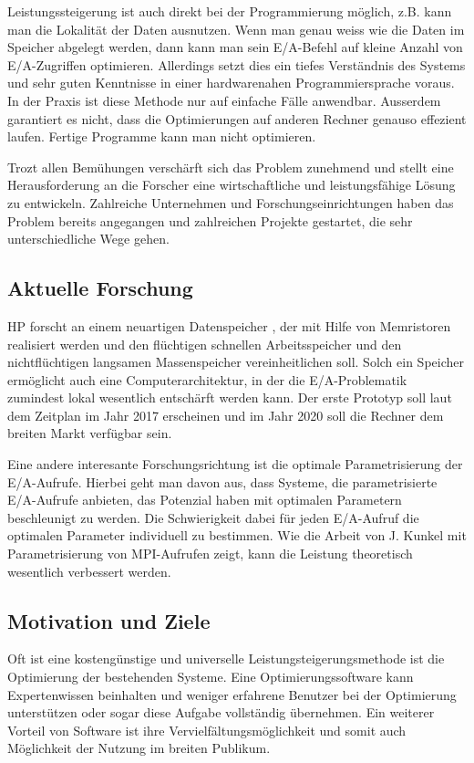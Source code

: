 Leistungssteigerung ist auch direkt bei der Programmierung möglich, z.B. kann man die Lokalität der Daten ausnutzen. Wenn man genau weiss wie die Daten im Speicher abgelegt werden, dann kann man sein E/A-Befehl auf kleine Anzahl von E/A-Zugriffen optimieren. Allerdings setzt dies ein tiefes Verständnis des Systems und sehr guten Kenntnisse in einer hardwarenahen Programmiersprache voraus. In der Praxis ist diese Methode nur auf einfache Fälle anwendbar. Ausserdem garantiert es nicht, dass die Optimierungen auf anderen Rechner genauso effezient laufen. Fertige Programme kann man nicht optimieren.

Trozt allen Bemühungen verschärft sich das Problem zunehmend und stellt eine Herausforderung an die Forscher eine wirtschaftliche und leistungsfähige Lösung zu entwickeln. Zahlreiche Unternehmen und Forschungseinrichtungen haben das Problem bereits angegangen und zahlreichen Projekte gestartet, die sehr unterschiedliche Wege gehen.


\subsection{Aktuelle Forschung}
HP forscht an einem neuartigen Datenspeicher \cite{hp_memristor_future}, der mit Hilfe von Memristoren realisiert werden und den flüchtigen schnellen Arbeitsspeicher und den nichtflüchtigen langsamen Massenspeicher vereinheitlichen soll. Solch ein Speicher ermöglicht auch eine Computerarchitektur, in der die E/A-Problematik zumindest lokal wesentlich entschärft werden kann. Der erste Prototyp soll laut dem Zeitplan im Jahr 2017 erscheinen und im Jahr 2020 soll die Rechner dem breiten Markt verfügbar sein. 

Eine andere interesante Forschungsrichtung ist die optimale Parametrisierung der E/A-Aufrufe. Hierbei geht man davon aus, dass Systeme, die parametrisierte E/A-Aufrufe anbieten, das Potenzial haben mit optimalen Parametern beschleunigt zu werden. Die Schwierigkeit dabei für jeden E/A-Aufruf die optimalen Parameter individuell zu bestimmen. Wie die Arbeit von J. Kunkel mit Parametrisierung von MPI-Aufrufen zeigt, kann die Leistung theoretisch wesentlich verbessert werden. 


\subsection{Motivation und Ziele}
Oft ist eine kostengünstige und universelle Leistungsteigerungsmethode ist die Optimierung der bestehenden Systeme. Eine Optimierungssoftware kann Expertenwissen beinhalten und weniger erfahrene Benutzer bei der Optimierung unterstützen oder sogar diese Aufgabe vollständig übernehmen. Ein weiterer Vorteil von Software ist ihre Vervielfältungsmöglichkeit und somit auch Möglichkeit der Nutzung im breiten Publikum.

